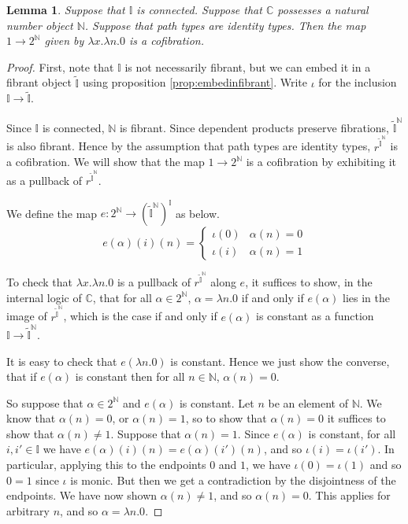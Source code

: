 \documentclass[a4paper]{amsart}
\newtheorem{lemma}[theorem]{Lemma}
\theoremstyle{definition}
\newcommand{\cat}[1]{\mathbb{#1}}
\newcommand{\catc}{\cat{C}}
\newcommand{\intv}{\mathbb{I}}
\newcommand{\fintv}{\tilde{\mathbb{I}}}
\newcommand{\nat}{\mathbb{N}}
\begin{document}
\begin{lemma}
  \label{lem:constiscof}
  Suppose that $\intv$ is connected. Suppose that $\catc$ possesses a
  natural number object $\nat$. Suppose that path types are identity
  types. Then the map $1 \to 2^\nat$ given by $\lambda x.\lambda n.0$
  is a cofibration.
\end{lemma}

\begin{proof}
  First, note that $\intv$ is not necessarily fibrant, but we can
  embed it in a fibrant object $\fintv$ using proposition
  \ref{prop:embedinfibrant}. Write $\iota$ for the inclusion $\intv
  \to \fintv$.

  Since $\intv$ is connected, $\nat$ is fibrant. Since dependent
  products preserve fibrations, $\fintv^\nat$ is also fibrant. Hence
  by the assumption that path types are identity types,
  $r^{\fintv^\nat}$ is a cofibration. We will show that the map $1 \to
  2^\nat$ is a cofibration by exhibiting it as a pullback of
  $r^{\fintv^\nat}$.

  We define the map $e \colon 2^\nat \to (\fintv^\nat)^\intv$ as
  below.
  \begin{equation*}
    e(\alpha)(i)(n) =
    \begin{cases}
      \iota(0) & \alpha(n) = 0 \\
      \iota(i) & \alpha(n) = 1
    \end{cases}
  \end{equation*}

  To check that $\lambda x.\lambda n.0$ is a pullback of
  $r^{\fintv^\nat}$ along $e$, it suffices to show, in the internal
  logic of $\catc$, that for all
  $\alpha \in 2^\nat$, $\alpha = \lambda n.0$ if and only if
  $e(\alpha)$ lies in the image of $r^{\fintv^\nat}$, which is the
  case if and only if $e(\alpha)$ is constant as a function
  $\intv \to \fintv^\nat$.

  It is easy to check that $e(\lambda n.0)$ is constant. Hence we just
  show the converse, that if $e(\alpha)$ is constant then for all $n
  \in \nat$, $\alpha(n) = 0$.

  So suppose that $\alpha \in 2^\nat$ and $e(\alpha)$ is constant. Let
  $n$ be an element of $\nat$. We know that $\alpha(n) = 0$, or
  $\alpha(n) = 1$, so to show that $\alpha(n) = 0$ it suffices to show
  that $\alpha(n) \neq 1$. Suppose that $\alpha(n) = 1$. Since
  $e(\alpha)$ is constant, for all $i, i' \in \intv$ we have
  $e(\alpha)(i)(n) = e(\alpha)(i')(n)$, and so $\iota(i) =
  \iota(i')$. In particular, applying this to the endpoints $0$ and
  $1$, we have $\iota(0) = \iota(1)$ and so $0 = 1$ since $\iota$ is
  monic. But then we get a contradiction by the disjointness of the
  endpoints. We have now shown $\alpha(n) \neq 1$, and so
  $\alpha(n) = 0$. This applies for arbitrary $n$, and so
  $\alpha = \lambda n.0$.
\end{proof}
\end{document}
